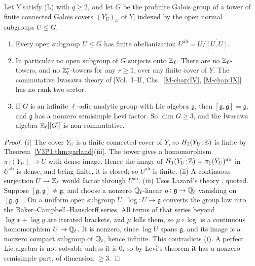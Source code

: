 \begin{proposition}\label{V3P1:prop:fab}
Let $Y$ satisfy \textup{(L)} with $q\ge2$, and let $G$ be the profinite Galois group of a tower
of finite connected Galois covers $(Y_U)_U$ of $Y$, indexed by the open normal subgroups
$U\le G$.
\begin{enumerate}
\item[(i)] Every open subgroup $U\le G$ has finite abelianization
$U^{\mathrm{ab}}=U/\overline{[U,U]}$.
\item[(ii)] In particular no open subgroup of $G$ surjects onto $\mathbb{Z}_\ell$. There are no
$\mathbb{Z}_\ell$-towers, and no $\mathbb{Z}_\ell^{r}$-towers for any $r\ge1$, over any finite cover of $Y$.
The commutative Iwasawa theory of {\rm[Vol.~I--II, Chs.~\ref{M-chap:IV}, \ref{M-chap:IX}]} has no rank-two
sector.
\item[(iii)] If $G$ is an infinite $\ell$-adic analytic group with Lie algebra $\mathfrak g$,
then $[\mathfrak g,\mathfrak g]=\mathfrak g$, and $\mathfrak g$ has a nonzero semisimple Levi
factor. So $\dim G\ge3$, and the Iwasawa algebra $\mathbb{Z}_\ell[[G]]$ is non-commutative.
\end{enumerate}
\end{proposition}

\begin{proof}
(i) The cover $Y_U$ is a finite connected cover of $Y$, so $H_1(Y_U;\mathbb{Z})$ is finite by
Theorem~\ref{V3P1:thm:garland}(iii). The tower gives a homomorphism
$\pi_1(Y_U)\to U$ with dense image. Hence the image of $H_1(Y_U;\mathbb{Z})=\pi_1(Y_U)^{\mathrm{ab}}$
in $U^{\mathrm{ab}}$ is dense, and being finite, it is closed; so $U^{\mathrm{ab}}$ is
finite. (ii) A continuous surjection $U\to\mathbb{Z}_\ell$ would factor through $U^{\mathrm{ab}}$.
(iii) Uses Lazard's theory \cite{Laz65,DDMS}, quoted. Suppose $[\mathfrak g,\mathfrak g]\neq
\mathfrak g$, and choose a nonzero $\mathbb{Q}_\ell$-linear $\mu\colon\mathfrak g\to\mathbb{Q}_\ell$ vanishing
on $[\mathfrak g,\mathfrak g]$. On a uniform open subgroup $U$, $\log\colon U\to\mathfrak g$
converts the group law into the Baker--Campbell--Hausdorff series. All terms of that series
beyond $\log x+\log y$ are iterated brackets, and $\mu$ kills them, so $\mu\circ\log$ is a
continuous homomorphism $U\to\mathbb{Q}_\ell$. It is nonzero, since $\log U$ spans $\mathfrak g$, and
its image is a nonzero compact subgroup of $\mathbb{Q}_\ell$, hence infinite. This contradicts (i).
A perfect Lie algebra is not solvable unless it is $0$, so by Levi's theorem it has a nonzero
semisimple part, of dimension $\ge3$.
\end{proof}


